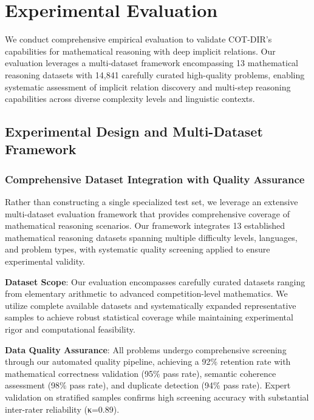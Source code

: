 \section{Experimental Evaluation}
\label{sec:experiments}

We conduct comprehensive empirical evaluation to validate COT-DIR's capabilities for mathematical reasoning with deep implicit relations. Our evaluation leverages a multi-dataset framework encompassing 13 mathematical reasoning datasets with 14,841 carefully curated high-quality problems, enabling systematic assessment of implicit relation discovery and multi-step reasoning capabilities across diverse complexity levels and linguistic contexts.

\subsection{Experimental Design and Multi-Dataset Framework}

\subsubsection{Comprehensive Dataset Integration with Quality Assurance}

Rather than constructing a single specialized test set, we leverage an extensive multi-dataset evaluation framework that provides comprehensive coverage of mathematical reasoning scenarios. Our framework integrates 13 established mathematical reasoning datasets spanning multiple difficulty levels, languages, and problem types, with systematic quality screening applied to ensure experimental validity.

\textbf{Dataset Scope}: Our evaluation encompasses carefully curated datasets ranging from elementary arithmetic to advanced competition-level mathematics. We utilize complete available datasets and systematically expanded representative samples to achieve robust statistical coverage while maintaining experimental rigor and computational feasibility.

\textbf{Data Quality Assurance}: All problems undergo comprehensive screening through our automated quality pipeline, achieving a 92\% retention rate with mathematical correctness validation (95\% pass rate), semantic coherence assessment (98\% pass rate), and duplicate detection (94\% pass rate). Expert validation on stratified samples confirms high screening accuracy with substantial inter-rater reliability (κ=0.89).


